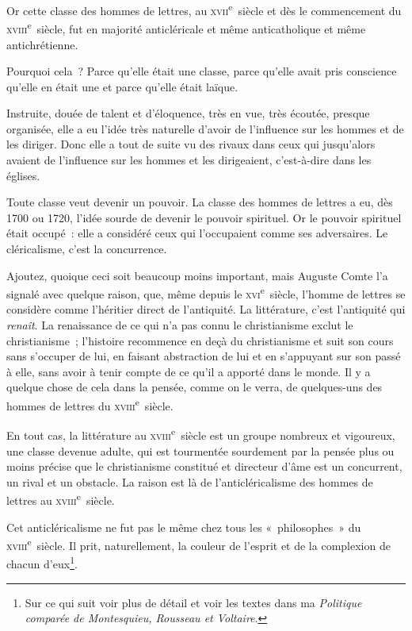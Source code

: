 \documentclass[french,twoside]{book} %
\begin{document}
Or cette classe des hommes de lettres, au  \textsc{xvii}\textsuperscript{e} siècle et dès le commencement du \textsc{xviii}\textsuperscript{e} siècle, fut en majorité anticléricale et même anticatholique et même antichrétienne.\par
Pourquoi cela ? Parce qu’elle était une classe, parce qu’elle avait pris conscience qu’elle en était une et parce qu’elle était laïque.\par
Instruite, douée de talent et d’éloquence, très en vue, très écoutée, presque organisée, elle a eu l’idée très naturelle d’avoir de l’influence sur les hommes et de les diriger. Donc elle a tout de suite vu des rivaux dans ceux qui jusqu’alors avaient de l’influence sur les hommes et les dirigeaient, c’est-à-dire dans les églises.\par
Toute classe veut devenir un pouvoir. La classe des hommes de lettres a eu, dès 1700 ou 1720, l’idée sourde de devenir le pouvoir spirituel. Or le pouvoir spirituel était occupé : elle a considéré ceux qui l’occupaient comme ses adversaires. Le cléricalisme, c’est la concurrence.\par
Ajoutez, quoique ceci soit beaucoup moins important, mais Auguste Comte l’a signalé avec quelque raison, que, même depuis le \textsc{xvi}\textsuperscript{e} siècle, l’homme de lettres se considère comme l’héritier direct de l’antiquité. La littérature, c’est l’antiquité qui {\itshape renaît}. La renaissance de ce qui n’a pas connu le christianisme exclut le christianisme ; l’histoire recommence en deçà du christianisme et suit son  cours sans s’occuper de lui, en faisant abstraction de lui et en s’appuyant sur son passé à elle, sans avoir à tenir compte de ce qu’il a apporté dans le monde. Il y a quelque chose de cela dans la pensée, comme on le verra, de quelques-uns des hommes de lettres du \textsc{xviii}\textsuperscript{e} siècle.\par
En tout cas, la littérature au \textsc{xviii}\textsuperscript{e} siècle est un groupe nombreux et vigoureux, une classe devenue adulte, qui est tourmentée sourdement par la pensée plus ou moins précise que le christianisme constitué et directeur d’âme est un concurrent, un rival et un obstacle. La raison est là de l’anticléricalisme des hommes de lettres au \textsc{xviii}\textsuperscript{e} siècle.\par
Cet anticléricalisme ne fut pas le même chez tous les « philosophes » du \textsc{xviii}\textsuperscript{e} siècle. Il prit, naturellement, la couleur de l’esprit et de la complexion de chacun d’eux\footnote{Sur ce qui suit voir plus de détail et voir les textes dans ma \emph{Politique comparée de Montesquieu, Rousseau et Voltaire}.}.\par
\end{document}
